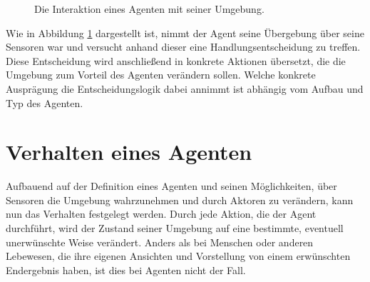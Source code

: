 	\begin{figure}[ht!]
		\centering
		\caption{Die Interaktion eines Agenten mit seiner Umgebung.}
		\label{fig:basics:agent}
	\end{figure}
	
	Wie in Abbildung \ref{fig:basics:agent} dargestellt ist, nimmt der Agent seine Übergebung über seine Sensoren war und versucht anhand dieser eine Handlungsentscheidung zu treffen. Diese Entscheidung wird anschließend in konkrete Aktionen übersetzt, die die Umgebung zum Vorteil des Agenten verändern sollen.
	Welche konkrete Ausprägung die Entscheidungslogik dabei annimmt ist abhängig vom Aufbau und Typ des Agenten. 

\section{Verhalten eines Agenten}
	\label{chap:basics:behaviour}
	
	Aufbauend auf der Definition eines Agenten und seinen Möglichkeiten, über Sensoren die Umgebung wahrzunehmen und durch Aktoren zu verändern, kann nun das Verhalten festgelegt werden. Durch jede Aktion, die der Agent durchführt, wird der Zustand seiner Umgebung auf eine bestimmte, eventuell unerwünschte Weise verändert. Anders als bei Menschen oder anderen Lebewesen, die ihre eigenen Ansichten und Vorstellung von einem erwünschten Endergebnis haben, ist dies bei Agenten nicht der Fall.
	
